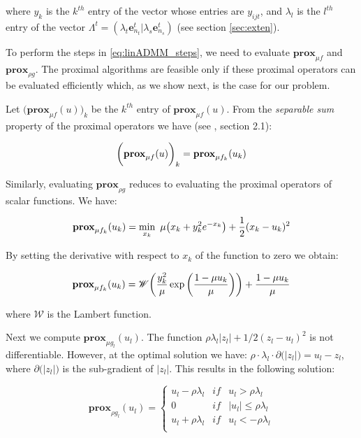 \documentclass[review]{elsarticle}
\begin{document}
\noindent where $y_k$ is the $k^{th}$ entry of the vector whose entries are $y_{ijt}$, and $\lambda_l$ is the $l^{th}$ entry of the vector $\Lambda^t=(\lambda_t\textbf{e}_{n_t}^t|\lambda_s\textbf{e}_{n_s}^t)$ (see section \ref{sec:exten}).

To perform the steps in \ref{eq:linADMM_steps}, we need to evaluate $\textbf{prox}_{\mu f}$ and $\textbf{prox}_{\rho g}$. The proximal algorithms are feasible only if these proximal operators can be evaluated efficiently which, as we show next, is the case for our problem. 

Let $\big(\textbf{prox}_{\mu f}(u)\big)_k$ be the $k^{th}$ entry of $\textbf{prox}_{\mu f}(u)$. From the \textit{separable sum} property of the proximal operators we have (see \cite{parikh_proximal_2014}, section 2.1):

\begin{equation}
\bigg(\textbf{prox}_{\mu f}(u)\bigg)_k = \textbf{prox}_{\mu f_k}(u_k)\\
\label{eq:linADMM_sepSum}
\end{equation}

Similarly, evaluating $\textbf{prox}_{\rho g}$ reduces to evaluating the proximal operators of scalar functions. We have:

\begin{equation}
\textbf{prox}_{\mu f_k}(u_k)=\min_{x_k} \,\, \mu\big(x_k+y_{k}^2e^{-x_{k}}\big)+\frac{1}{2}  (x_k-u_k)^2\\
\label{eq:linADMM_proxf}
\end{equation}

By setting the derivative with respect to $x_k$ of the function to zero we obtain:

\begin{equation}
\textbf{prox}_{\mu f_k}(u_k)=\mathscr{W}\bigg(\frac{y_k^2}{\mu} \exp\bigg(\frac{1-\mu u_k}{\mu}\bigg) \bigg) + \frac{1-\mu u_k}{\mu}\\
\label{eq:linADMM_proxf_sol}
\end{equation}

\noindent where $\mathscr{W}$ is the Lambert function.

Next we compute $\textbf{prox}_{\mu g_l}(u_l)$. The function $\rho \lambda_l |z_l|+1/2(z_l-u_l)^2$ is not differentiable. However, at the optimal solution we have: $\rho \cdot \lambda_l \cdot \partial \big(|z_l| \big)=u_l-z_l$, where $\partial \big(|z_l| \big)$ is the sub-gradient of $|z_l|$. This results in the following solution:

\begin{equation}
\textbf{prox}_{\rho g_l}(u_l)=\left\{\begin{matrix}
 u_l-\rho \lambda_l  & if &  u_l>\rho \lambda_l\\ 
 0  \,\,\,\,\,  & if &  |u_l|\le \rho \lambda_l\\ 
 u_l+\rho \lambda_l  &  if &  u_l<-\rho \lambda_l\\ 

\end{matrix}\right.
\label{eq:linADMM_proxg_sol}
\end{equation}
\end{document}
